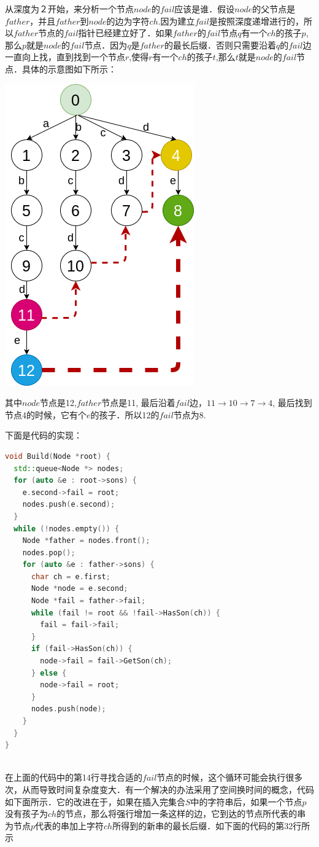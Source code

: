 \documentclass{article}
\begin{document}
从深度为２开始，来分析一个节点$node$的$fail$应该是谁．假设$node$的父节点是$father$，并且$father$到$node$的边为字符$ch$.因为建立$fail$是按照深度递增进行的，所以$father$节点的$fail$指针已经建立好了．如果$father$的$fail$节点$q$有一个$ch$的孩子$p$,那么$p$就是$node$的$fail$节点．因为$q$是$father$的最长后缀．否则只需要沿着$q$的$fail$边一直向上找，直到找到一个节点$r$,使得$r$有一个$ch$的孩子$t$,那么$t$就是$node$的$fail$节点．具体的示意图如下所示：　\par
\includegraphics[scale=0.64]{pic6.png} \par
其中$node$节点是12,$father$节点是11, 最后沿着$fail$边，$11\rightarrow 10\rightarrow 7\rightarrow 4$, 最后找到节点4的时候，它有个$e$的孩子．所以12的$fail$节点为8. \par
下面是代码的实现：　\par
\begin{lstlisting}[language=C++, caption={Build}]
void Build(Node *root) {
  std::queue<Node *> nodes;
  for (auto &e : root->sons) {
    e.second->fail = root;
    nodes.push(e.second);
  }
  while (!nodes.empty()) {
    Node *father = nodes.front();
    nodes.pop();
    for (auto &e : father->sons) {
      char ch = e.first;
      Node *node = e.second;
      Node *fail = father->fail;
      while (fail != root && !fail->HasSon(ch)) {
        fail = fail->fail;
      }
      if (fail->HasSon(ch)) {
        node->fail = fail->GetSon(ch);
      } else {
        node->fail = root;
      }
      nodes.push(node);
    }
  }
}

\end{lstlisting}
~\\
在上面的代码中的第14行寻找合适的$fail$节点的时候，这个循环可能会执行很多次，从而导致时间复杂度变大．有一个解决的办法采用了空间换时间的概念，代码如下面所示．它的改进在于，如果在插入完集合$S$中的字符串后，如果一个节点$p$没有孩子为$ch$的节点，那么将强行增加一条这样的边，它到达的节点所代表的串为节点$p$代表的串加上字符$ch$所得到的新串的最长后缀．如下面的代码的第32行所示 \par
\end{document}
